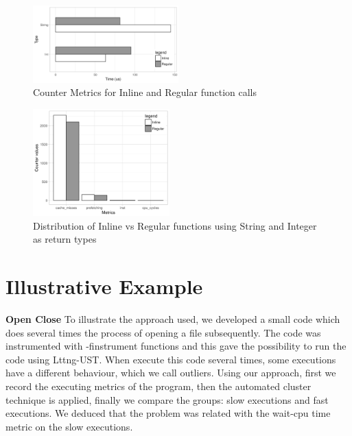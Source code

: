     \begin{figure}[h]
      \centering
        \includegraphics[width=0.5\textwidth]{figures/bar-inline-vs-regular.png}
        \caption{Counter Metrics for Inline and Regular function calls}
        \label{fig:notinline}
    \end{figure}
    
    \begin{figure}[h]
      \centering
        \includegraphics[width=0.47\textwidth]{figures/barplots-inline-vs-regular-counters.png}
        \caption{Distribution of Inline vs Regular functions using String and Integer as return types}
        \label{fig:inline}
    \end{figure}
    
    
    \section{Illustrative Example}
    
\textbf{Open Close}
    To illustrate the approach used, we developed a small code which does several times the process of opening a file subsequently. The code was instrumented with -finstrument functions and this gave the possibility to run the code using Lttng-UST.
    When execute this code several times, some executions have a different behaviour, which we call outliers.
    Using our approach, first we record the executing metrics of the program, then the automated cluster technique is applied, finally we compare the groups: slow executions and fast executions. We deduced that the problem was related with the wait-cpu time metric on the slow executions.
    
